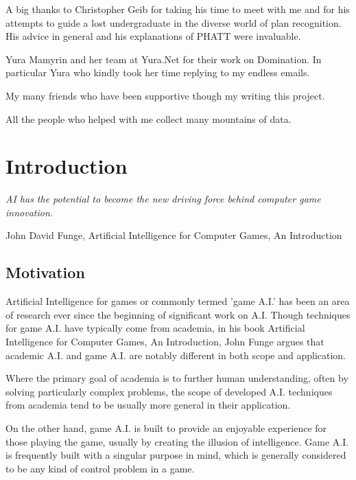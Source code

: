 \documentclass[parskip]{cs4rep}
\begin{document}
A big thanks to Christopher Geib for taking his time to meet with me and for his attempts to guide a lost undergraduate in the diverse world of plan recognition. His advice in general and his explanations of PHATT were invaluable. 

Yura Mamyrin and her team at Yura.Net for their work on Domination. In particular Yura who kindly took her time replying to my endless emails.

My many friends who have been supportive though my writing this project. 

All the people who helped with me collect many mountains of data.

\tableofcontents


\chapter{Introduction}

\begin{flushleft}
\textit{AI has the potential to become the new driving force behind computer game innovation.}
\end{flushleft}
\begin{flushleft}
John David Funge, Artificial Intelligence for Computer Games, An Introduction
\end{flushleft}

\section{Motivation}

Artificial Intelligence for games or commonly termed 'game A.I.' has been an area of research ever since the beginning of significant work on A.I. Though techniques for game A.I. have typically come from academia, in his book Artificial Intelligence for Computer Games, An Introduction, John Funge argues \cite{JohnFunge:AIForComp} that academic A.I. and game A.I. are notably different in both scope and application.

Where the primary goal of academia is to further human understanding, often by solving particularly complex problems, the scope of developed A.I. techniques from academia tend to be usually more general in their application.

On the other hand, game A.I. is built to provide an enjoyable experience for those playing the game, usually by creating the illusion of intelligence. Game A.I. is frequently built with a singular purpose in mind, which is generally considered to be any kind of control problem in a game.
\end{document}

